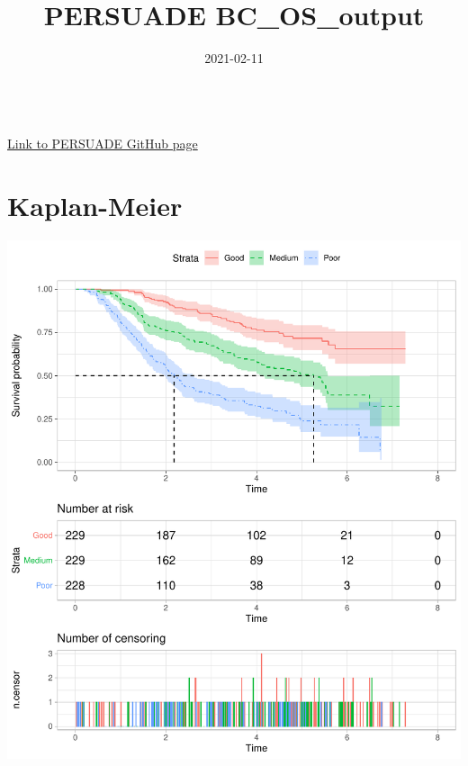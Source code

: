 \documentclass[
]{article}
\title{PERSUADE BC\_OS\_output}
\author{}
\date{\vspace{-2.5em}2021-02-11}
\begin{document}
\maketitle

{
\hypersetup{linkcolor=}
\setcounter{tocdepth}{2}
\tableofcontents
}
~\\

\href{https://github.com/Bram-R/PERSUADE}{Link to PERSUADE GitHub page}
\newpage

\hypertarget{kaplan-meier}{%
\section{Kaplan-Meier}\label{kaplan-meier}}

\begin{flushleft}\includegraphics{Images/plot_KM-1} \end{flushleft}
\end{document}
